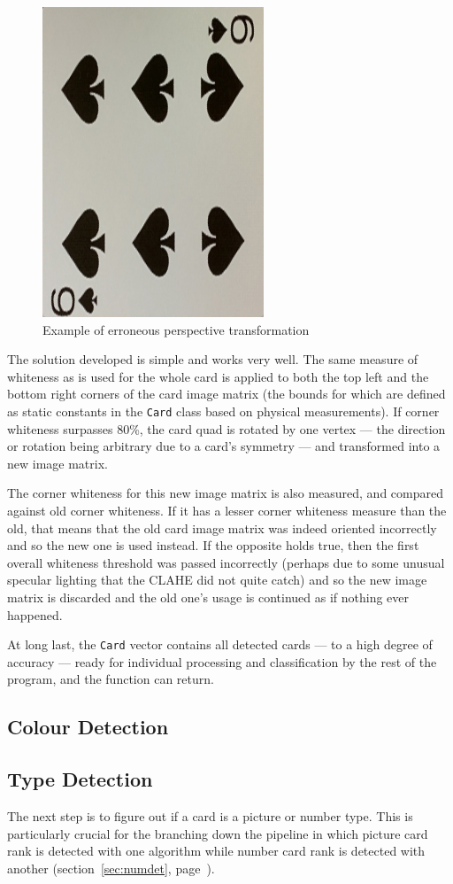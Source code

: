 \documentclass[a4paper,12pt,notitlepage]{article}
\newcommand{\secref}[1]{(section~\ref{#1}, page~\pageref{#1})}
\newcommand{\code}[1]{\lstinline[basicstyle=\ttfamily,breakautoindent=false,postbreak={}]|#1|}
\begin{document}
\begin{figure}[H]
				\includegraphics[width=0.3\linewidth]{rot4}
				\caption{Example of erroneous perspective transformation}
				\label{fig:rot}
			\end{figure}

			The solution developed is simple and works very well. The same measure of whiteness as is used for the whole card is applied to both the top left and the bottom right corners of the card image matrix (the bounds for which are defined as static constants in the \code{Card} class based on physical measurements). If corner whiteness surpasses 80\%, the card quad is rotated by one vertex --- the direction or rotation being arbitrary due to a card's symmetry --- and transformed into a new image matrix.

			The corner whiteness for this new image matrix is also measured, and compared against old corner whiteness. If it has a lesser corner whiteness measure than the old, that means that the old card image matrix was indeed oriented incorrectly and so the new one is used instead. If the opposite holds true, then the first overall whiteness threshold was passed incorrectly (perhaps due to some unusual specular lighting that the CLAHE did not quite catch) and so the new image matrix is discarded and the old one's usage is continued as if nothing ever happened.

			At long last, the \code{Card} vector contains all detected cards --- to a high degree of accuracy --- ready for individual processing and classification by the rest of the program, and the function can return.
	\subsection{Colour Detection}
		
	\subsection{Type Detection}
		\label{sec:typedet}
		The next step is to figure out if a card is a picture or number type. This is particularly crucial for the branching down the pipeline in which picture card rank is detected with one algorithm while number card rank is detected with another \secref{sec:numdet}.
\end{document}
